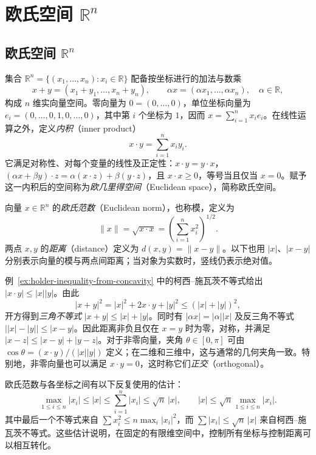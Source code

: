 \documentclass[UTF8,12pt,a4paper,fontset=fandol]{ctexbook}
\begin{document}
\section{欧氏空间 \texorpdfstring{$\mathbb{R}^n$}{R^n}}
\label{sec:euclidean-space}

\subsection{欧氏空间 \texorpdfstring{$\mathbb{R}^n$}{R^n}}
\label{subsec:euclidean-space}

集合 $\mathbb R^n=\{(x_1,\ldots,x_n):x_i\in\mathbb R\}$ 配备按坐标进行的加法与数乘
\[
    x+y=(x_1+y_1,\ldots,x_n+y_n),\qquad
    \alpha x=(\alpha x_1,\ldots,\alpha x_n),\quad \alpha\in\mathbb R,
\]
构成 $n$ 维实向量空间。零向量为 $0=(0,\ldots,0)$，单位坐标向量为 $e_i=(0,\ldots,0,1,0,\ldots,0)$，其中第 $i$ 个坐标为 $1$，因而 $x=\sum_{i=1}^n x_i e_i$。在线性运算之外，定义\emph{内积}（inner product）
\[
    x\cdot y=\sum_{i=1}^n x_i y_i.
\]
它满足对称性、对每个变量的线性及正定性：$x\cdot y=y\cdot x$，$(\alpha x+\beta y)\cdot z=\alpha(x\cdot z)+\beta(y\cdot z)$，且 $x\cdot x\geq0$，等号当且仅当 $x=0$。赋予这一内积后的空间称为\emph{欧几里得空间}（Euclidean space），简称欧氏空间。

\begin{definition}
\label{def:euclidean-norm-and-distance}
向量 $x\in\mathbb R^n$ 的\emph{欧氏范数}（Euclidean norm），也称模，定义为
\[
    \|x\|=\sqrt{x\cdot x}=\left(\sum_{i=1}^n x_i^2\right)^{1/2}.
\]
两点 $x,y$ 的\emph{距离}（distance）定义为 $d(x,y)=\|x-y\|$。以下也用 $|x|$、$|x-y|$ 分别表示向量的模与两点间距离；当对象为实数时，竖线仍表示绝对值。
\end{definition}

例~\ref{ex:holder-inequality-from-concavity} 中的柯西--施瓦茨不等式给出 $|x\cdot y|\leq|x||y|$。由此
\[
    |x+y|^2=|x|^2+2x\cdot y+|y|^2\leq(|x|+|y|)^2,
\]
开方得到\emph{三角不等式} $|x+y|\leq|x|+|y|$。同时有 $|\alpha x|=|\alpha||x|$ 及反三角不等式 $\bigl||x|-|y|\bigr|\leq|x-y|$。因此距离非负且仅在 $x=y$ 时为零，对称，并满足 $|x-z|\leq|x-y|+|y-z|$。对于非零向量，夹角 $\theta\in[0,\pi]$ 可由 $\cos\theta=(x\cdot y)/(|x||y|)$ 定义；在二维和三维中，这与通常的几何夹角一致。特别地，非零向量也可以满足 $x\cdot y=0$，这时称它们\emph{正交}（orthogonal）。

欧氏范数与各坐标之间有以下反复使用的估计：
\begin{equation}
    \max_{1\leq i\leq n}|x_i|
    \leq |x|\leq\sum_{i=1}^n|x_i|
    \leq\sqrt n\,|x|,
    \qquad
    |x|\leq\sqrt n\max_{1\leq i\leq n}|x_i|.
    \label{eq:euclidean-coordinate-norm-bounds}
\end{equation}
其中最后一个不等式来自 $\sum x_i^2\leq n\max_i|x_i|^2$，而 $\sum|x_i|\leq\sqrt n\,|x|$ 来自柯西--施瓦茨不等式。这些估计说明，在固定的有限维空间中，控制所有坐标与控制距离可以相互转化。
\end{document}
